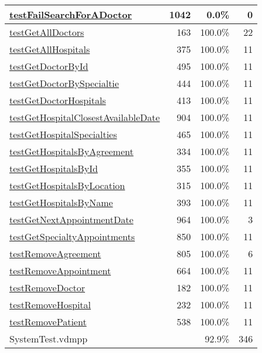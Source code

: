 \begin{longtable}{|l|r|r|r|}
\hyperref[testFailSearchForADoctor:1042]{testFailSearchForADoctor} & 1042&0.0\% & 0 \\
\hline
\hyperref[testGetAllDoctors:163]{testGetAllDoctors} & 163&100.0\% & 22 \\
\hline
\hyperref[testGetAllHospitals:375]{testGetAllHospitals} & 375&100.0\% & 11 \\
\hline
\hyperref[testGetDoctorById:495]{testGetDoctorById} & 495&100.0\% & 11 \\
\hline
\hyperref[testGetDoctorBySpecialtie:444]{testGetDoctorBySpecialtie} & 444&100.0\% & 11 \\
\hline
\hyperref[testGetDoctorHospitals:413]{testGetDoctorHospitals} & 413&100.0\% & 11 \\
\hline
\hyperref[testGetHospitalClosestAvailableDate:904]{testGetHospitalClosestAvailableDate} & 904&100.0\% & 11 \\
\hline
\hyperref[testGetHospitalSpecialties:465]{testGetHospitalSpecialties} & 465&100.0\% & 11 \\
\hline
\hyperref[testGetHospitalsByAgreement:334]{testGetHospitalsByAgreement} & 334&100.0\% & 11 \\
\hline
\hyperref[testGetHospitalsById:355]{testGetHospitalsById} & 355&100.0\% & 11 \\
\hline
\hyperref[testGetHospitalsByLocation:315]{testGetHospitalsByLocation} & 315&100.0\% & 11 \\
\hline
\hyperref[testGetHospitalsByName:393]{testGetHospitalsByName} & 393&100.0\% & 11 \\
\hline
\hyperref[testGetNextAppointmentDate:964]{testGetNextAppointmentDate} & 964&100.0\% & 3 \\
\hline
\hyperref[testGetSpecialtyAppointments:850]{testGetSpecialtyAppointments} & 850&100.0\% & 11 \\
\hline
\hyperref[testRemoveAgreement:805]{testRemoveAgreement} & 805&100.0\% & 6 \\
\hline
\hyperref[testRemoveAppointment:664]{testRemoveAppointment} & 664&100.0\% & 11 \\
\hline
\hyperref[testRemoveDoctor:182]{testRemoveDoctor} & 182&100.0\% & 11 \\
\hline
\hyperref[testRemoveHospital:232]{testRemoveHospital} & 232&100.0\% & 11 \\
\hline
\hyperref[testRemovePatient:538]{testRemovePatient} & 538&100.0\% & 11 \\
\hline
\hline
SystemTest.vdmpp & & 92.9\% & 346 \\
\hline
\end{longtable}

